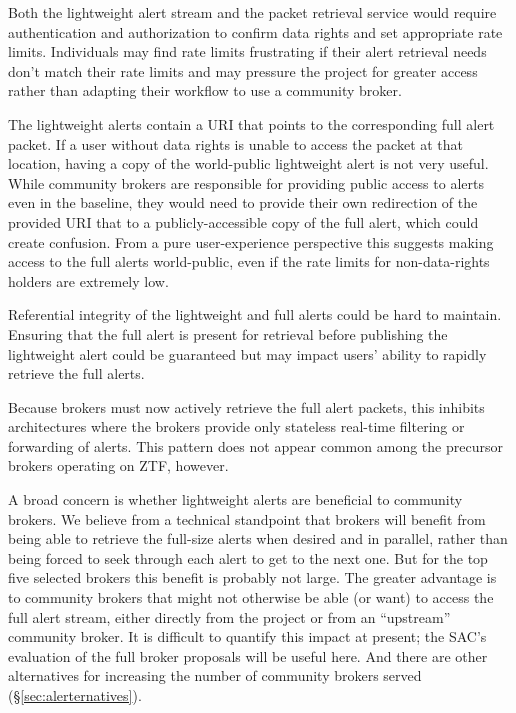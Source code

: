\documentclass[DM,authoryear,toc]{lsstdoc}
\begin{document}
Both the lightweight alert stream and the packet retrieval service would require authentication and authorization to confirm data rights and set appropriate rate limits.
Individuals may find rate limits frustrating if their alert retrieval needs don't match their rate limits and may pressure the project for greater access rather than adapting their workflow to use a community broker.

The lightweight alerts contain a URI that points to the corresponding full alert packet.
If a user without data rights is unable to access the packet at that location, having a copy of the world-public lightweight alert is not very useful.
While community brokers are responsible for providing public access to alerts even in the baseline, they would need to provide their own redirection of the provided URI that to a publicly-accessible copy of the full alert, which could create confusion.
From a pure user-experience perspective this suggests making access to the full alerts world-public, even if the rate limits for non-data-rights holders are extremely low.

Referential integrity of the lightweight and full alerts could be hard to maintain.
Ensuring that the full alert is present for retrieval before publishing the lightweight alert could be guaranteed
but may impact users' ability to rapidly retrieve the full alerts.

Because brokers must now actively retrieve the full alert packets, this inhibits architectures where the brokers provide only stateless real-time filtering or forwarding of alerts.
This pattern does not appear common among the precursor brokers operating on ZTF, however.

A broad concern is whether lightweight alerts are beneficial to community brokers.
We believe from a technical standpoint that brokers will benefit from being able to retrieve the full-size alerts when desired and in parallel, rather than being forced to seek through each alert to get to the next one.
But for the top five selected brokers this benefit is probably not large.
The greater advantage is to community brokers that might not otherwise be able (or want) to access the full alert stream, either directly from the project or from an ``upstream'' community broker.
It is difficult to quantify this impact at present; the SAC's evaluation of the full broker proposals will be useful here.
And there are other alternatives for increasing the number of community brokers served (\S \ref{sec:alerternatives}).
\end{document}
